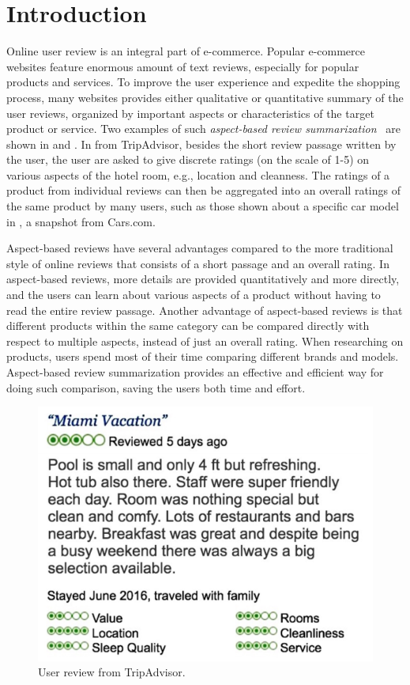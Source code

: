 \section{Introduction}
\label{sec:intro}

Online user review is an integral part of e-commerce. Popular e-commerce
websites feature enormous amount of text reviews, especially for popular
products and services. To improve the user experience and expedite the
shopping process, many websites provides either qualitative or quantitative
summary of the user reviews, organized by important aspects or characteristics
of the target product or service.
Two examples of such \emph{aspect-based review 
summarization}~\cite{hu2004mining} are shown in  
and . In  from TripAdvisor, 
besides the short review passage written by the user, the user are asked
to give discrete ratings (on the scale of 1-5) on various aspects of 
the hotel room, e.g., location and cleanness. The ratings of 
a product from individual reviews can then be aggregated into an overall
ratings of the same product by many users, such as those shown
about a specific car model in , a snapshot from Cars.com. 

Aspect-based reviews have several advantages compared to the more traditional 
style of online reviews that consists of a short passage and an overall rating. 
In aspect-based reviews, more details are provided quantitatively and 
more directly, and the users can learn about various aspects of a product 
without having to read the entire review passage. Another advantage of 
aspect-based reviews is that different products within the same category 
can be compared directly with respect to multiple aspects, 
instead of just an overall rating. When researching on products, 
users spend most of their time comparing different brands and models. 
Aspect-based review summarization provides an effective and efficient way for 
doing such comparison, saving the users both time and effort.


\begin{figure}[th]
\centering
\includegraphics[width=0.7\columnwidth]{figures/tripadvisor}
\caption{User review from TripAdvisor.}
\label{fig:tripadvisor}
\end{figure}

